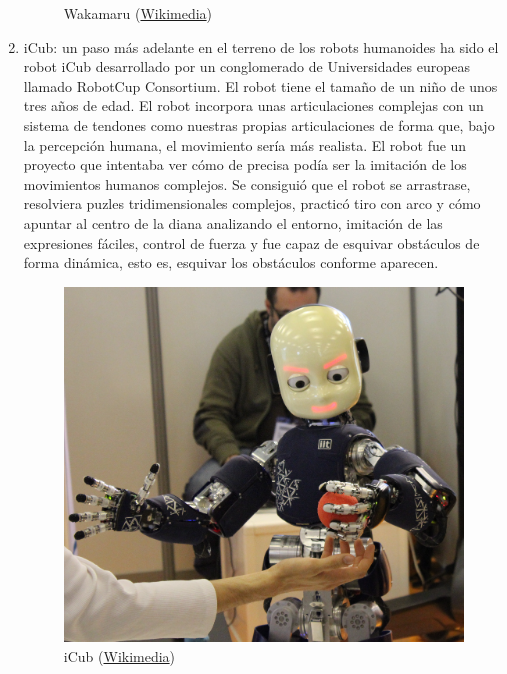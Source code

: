 \begin{enumerate}
\begin{figure}[!h]
  	\caption{Wakamaru (\href{https://commons.wikimedia.org/wiki/File:Wakamaru-fullshot2011.jpg}{Wikimedia})}
  	\label{fig:wakamaru}
  \end{figure}
  \item iCub: un paso más adelante en el terreno de los robots humanoides ha sido el robot iCub desarrollado por un conglomerado de Universidades europeas llamado RobotCup Consortium. El robot tiene el tamaño de un niño de unos tres años de edad. El robot incorpora unas articulaciones complejas con un sistema de tendones como nuestras propias articulaciones de forma que, bajo la percepción humana, el movimiento sería más realista. El robot fue un proyecto que intentaba ver cómo de precisa podía ser la imitación de los movimientos humanos complejos. Se consiguió que el robot se arrastrase, resolviera puzles tridimensionales complejos, practicó tiro con arco y cómo apuntar al centro de la diana analizando el entorno, imitación de las expresiones fáciles, control de fuerza y fue capaz de esquivar obstáculos de forma dinámica, esto es, esquivar los obstáculos conforme aparecen.
  \begin{figure}[!h]
  	\centering
  	\includegraphics[scale=0.07]{./EtapaModerna/Imagenes/icub.JPG}
  	\caption{iCub (\href{https://commons.wikimedia.org/wiki/File:ICub_Innorobo_Lyon_2014.JPG}{Wikimedia})}
  	\label{fig:icub}
  \end{figure}
  \newpage

\end{enumerate}
